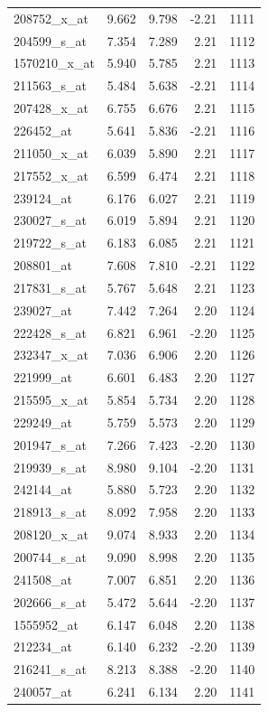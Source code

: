 \begin{footnotesize}
\begin{longtable}{lrrrr}
208752\_x\_at & 9.662 & 9.798 & -2.21 & 1111 \\
204599\_s\_at & 7.354 & 7.289 & 2.21 & 1112 \\
1570210\_x\_at & 5.940 & 5.785 & 2.21 & 1113 \\
211563\_s\_at & 5.484 & 5.638 & -2.21 & 1114 \\
207428\_x\_at & 6.755 & 6.676 & 2.21 & 1115 \\
226452\_at & 5.641 & 5.836 & -2.21 & 1116 \\
211050\_x\_at & 6.039 & 5.890 & 2.21 & 1117 \\
217552\_x\_at & 6.599 & 6.474 & 2.21 & 1118 \\
239124\_at & 6.176 & 6.027 & 2.21 & 1119 \\
230027\_s\_at & 6.019 & 5.894 & 2.21 & 1120 \\
219722\_s\_at & 6.183 & 6.085 & 2.21 & 1121 \\
208801\_at & 7.608 & 7.810 & -2.21 & 1122 \\
217831\_s\_at & 5.767 & 5.648 & 2.21 & 1123 \\
239027\_at & 7.442 & 7.264 & 2.20 & 1124 \\
222428\_s\_at & 6.821 & 6.961 & -2.20 & 1125 \\
232347\_x\_at & 7.036 & 6.906 & 2.20 & 1126 \\
221999\_at & 6.601 & 6.483 & 2.20 & 1127 \\
215595\_x\_at & 5.854 & 5.734 & 2.20 & 1128 \\
229249\_at & 5.759 & 5.573 & 2.20 & 1129 \\
201947\_s\_at & 7.266 & 7.423 & -2.20 & 1130 \\
219939\_s\_at & 8.980 & 9.104 & -2.20 & 1131 \\
242144\_at & 5.880 & 5.723 & 2.20 & 1132 \\
218913\_s\_at & 8.092 & 7.958 & 2.20 & 1133 \\
208120\_x\_at & 9.074 & 8.933 & 2.20 & 1134 \\
200744\_s\_at & 9.090 & 8.998 & 2.20 & 1135 \\
241508\_at & 7.007 & 6.851 & 2.20 & 1136 \\
202666\_s\_at & 5.472 & 5.644 & -2.20 & 1137 \\
1555952\_at & 6.147 & 6.048 & 2.20 & 1138 \\
212234\_at & 6.140 & 6.232 & -2.20 & 1139 \\
216241\_s\_at & 8.213 & 8.388 & -2.20 & 1140 \\
240057\_at & 6.241 & 6.134 & 2.20 & 1141 \\

\end{longtable}
\end{footnotesize}
